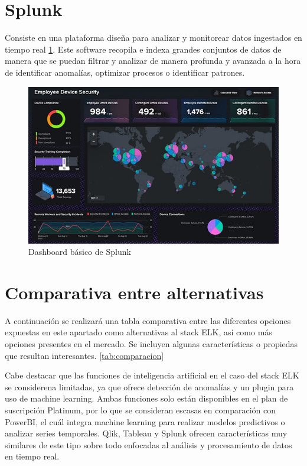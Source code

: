 \section{Splunk}
Consiste en una plataforma diseña para analizar y monitorear datos ingestados en tiempo real \ref{fig:splunk}. Este software recopila e indexa grandes conjuntos de datos de manera que se puedan filtrar y analizar de manera profunda y avanzada a la hora de identificar anomalías, optimizar procesos o identificar patrones.

\begin{figure}
    \centering
    \includegraphics[width=1\linewidth]{img/splunk.jpg}
    \caption{Dashboard básico de Splunk \cite{splunk}}
    \label{fig:splunk}
\end{figure}

\section{Comparativa entre alternativas}

A continuación se realizará una tabla comparativa entre las diferentes opciones expuestas en este apartado como alternativas al stack ELK, así como más opciones presentes en el mercado. Se incluyen algunas características o propiedas que resultan interesantes. \ref{tab:comparacion}

Cabe destacar que las funciones de inteligencia artificial en el caso del stack ELK se considerena limitadas, ya que ofrece detección de anomalías y un plugin para uso de machine learning. Ambas funciones solo están disponibles en el plan de suscripción Platinum, por lo que se consideran escasas en comparación con PowerBI, el cuál integra machine learning para realizar modelos predictivos o analizar series temporales. Qlik, Tableau y Splunk ofrecen características muy similares de este tipo sobre todo enfocadas al análisis y procesamiento de datos en tiempo real.


